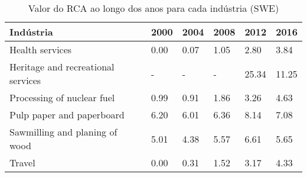 \begin{table}
\centering
\caption{Valor do RCA ao longo dos anos para cada indústria (SWE)}
\begin{tabular}{p{6cm}p{1.5cm}p{1.5cm}p{1.5cm}p{1.5cm}p{1.5cm}}
\toprule
                         Indústria & 2000 & 2004 & 2008 &  2012 &  2016 \\
\midrule
                   Health services & 0.00 & 0.07 & 1.05 &  2.80 &  3.84 \\
Heritage and recreational services &    - &    - &    - & 25.34 & 11.25 \\
        Processing of nuclear fuel & 0.99 & 0.91 & 1.86 &  3.26 &  4.63 \\
         Pulp paper and paperboard & 6.20 & 6.01 & 6.36 &  8.14 &  7.08 \\
    Sawmilling and planing of wood & 5.01 & 4.38 & 5.57 &  6.61 &  5.65 \\
                            Travel & 0.00 & 0.31 & 1.52 &  3.17 &  4.33 \\
\bottomrule
\end{tabular}
\end{table}
